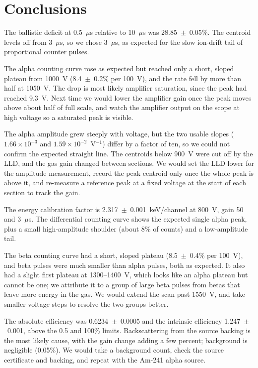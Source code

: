 \documentclass[12pt]{article}
\begin{document}
 
\section{Conclusions}
\label{sec:conclusions}
 
The ballistic deficit at 0.5~$\mu$s relative to 10~$\mu$s was 28.85~$\pm$~0.05\%. The centroid levels off from 3~$\mu$s, so we chose 3~$\mu$s, as expected for the slow ion-drift tail of proportional counter pulses.
 
The alpha counting curve rose as expected but reached only a short, sloped plateau from 1000~V (8.4~$\pm$~0.2\% per 100~V), and the rate fell by more than half at 1050~V. The drop is most likely amplifier saturation, since the peak had reached 9.3~V. Next time we would lower the amplifier gain once the peak moves above about half of full scale, and watch the amplifier output on the scope at high voltage so a saturated peak is visible.
 
The alpha amplitude grew steeply with voltage, but the two usable slopes ($1.66\times10^{-3}$ and $1.59\times10^{-2}$~V$^{-1}$) differ by a factor of ten, so we could not confirm the expected straight line. The centroids below 900~V were cut off by the LLD, and the gas gain changed between sections. We would set the LLD lower for the amplitude measurement, record the peak centroid only once the whole peak is above it, and re-measure a reference peak at a fixed voltage at the start of each section to track the gain.
 
The energy calibration factor is 2.317~$\pm$~0.001~keV/channel at 800~V, gain 50 and 3~$\mu$s. The differential counting curve shows the expected single alpha peak, plus a small high-amplitude shoulder (about 8\% of counts) and a low-amplitude tail.
 
The beta counting curve had a short, sloped plateau (8.5~$\pm$~0.4\% per 100~V), and beta pulses were much smaller than alpha pulses, both as expected. It also had a slight first plateau at 1300--1400~V, which looks like an alpha plateau but cannot be one; we attribute it to a group of large beta pulses from betas that leave more energy in the gas. We would extend the scan past 1550~V, and take smaller voltage steps to resolve the two groups better.
 
The absolute efficiency was 0.6234~$\pm$~0.0005 and the intrinsic efficiency 1.247~$\pm$~0.001, above the 0.5 and 100\% limits. Backscattering from the source backing is the most likely cause, with the gain change adding a few percent; background is negligible (0.05\%). We would take a background count, check the source certificate and backing, and repeat with the Am-241 alpha source.
 
\end{document}
